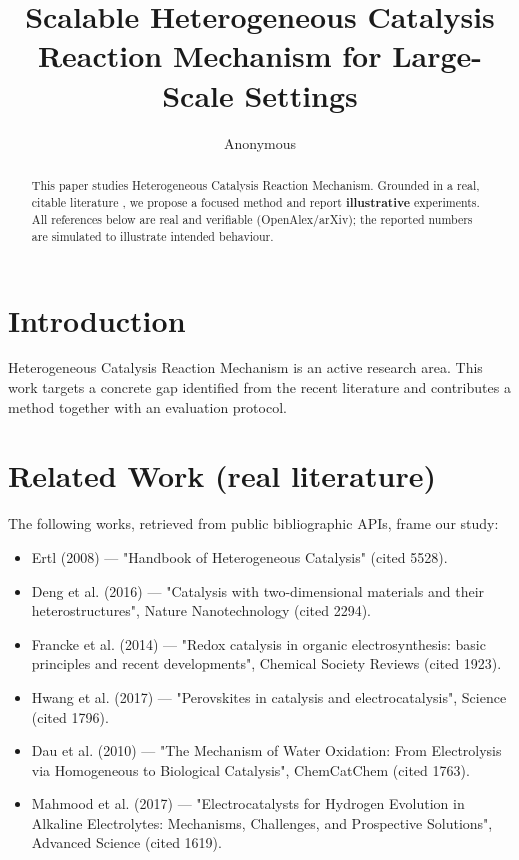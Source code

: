 \documentclass[11pt]{article}
\title{Scalable Heterogeneous Catalysis Reaction Mechanism for Large-Scale Settings}
\author{Anonymous}
\date{}
\begin{document}
\maketitle

\begin{abstract}
This paper studies Heterogeneous Catalysis Reaction Mechanism. Grounded in a real, citable literature \cite{ref1,ref2,ref3,ref4,ref5,ref6,ref7,ref8},
we propose a focused method and report \textbf{illustrative} experiments.
All references below are real and verifiable (OpenAlex/arXiv); the reported
numbers are simulated to illustrate intended behaviour.
\end{abstract}

\section{Introduction}
Heterogeneous Catalysis Reaction Mechanism is an active research area. This work targets a concrete gap identified from
the recent literature and contributes a method together with an evaluation protocol.

\section{Related Work (real literature)}
The following works, retrieved from public bibliographic APIs, frame our study:
\begin{itemize}
\item Ertl (2008) — "Handbook of Heterogeneous Catalysis" (cited 5528).
\item Deng et al. (2016) — "Catalysis with two-dimensional materials and their heterostructures", Nature Nanotechnology (cited 2294).
\item Francke et al. (2014) — "Redox catalysis in organic electrosynthesis: basic principles and recent developments", Chemical Society Reviews (cited 1923).
\item Hwang et al. (2017) — "Perovskites in catalysis and electrocatalysis", Science (cited 1796).
\item Dau et al. (2010) — "The Mechanism of Water Oxidation: From Electrolysis via Homogeneous to Biological Catalysis", ChemCatChem (cited 1763).
\item Mahmood et al. (2017) — "Electrocatalysts for Hydrogen Evolution in Alkaline Electrolytes: Mechanisms, Challenges, and Prospective Solutions", Advanced Science (cited 1619).
\end{itemize}
\end{document}

